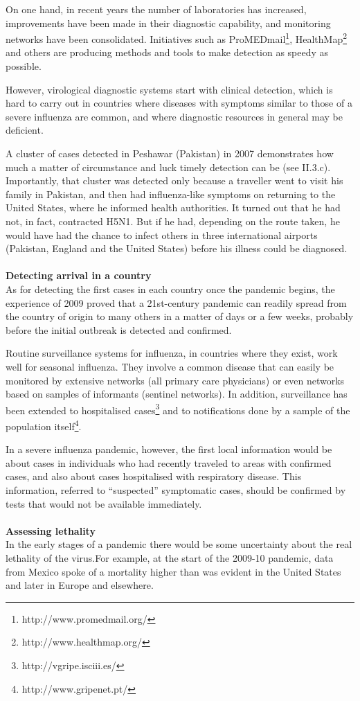 \documentclass[12pt, a4]{scrartcl}
\begin{document}
On one hand, in recent years the number of laboratories has increased, improvements have been made in their diagnostic capability, and monitoring networks have been consolidated. Initiatives such as ProMEDmail\footnote{http://www.promedmail.org/}, HealthMap\footnote{http://www.healthmap.org/} and others are producing methods and tools to make detection as speedy as possible.

However, virological diagnostic systems start with clinical detection, which is hard to carry out in countries where diseases with symptoms similar to those of a severe influenza are common, and where diagnostic resources in general may be deficient.

A cluster of cases detected in Peshawar (Pakistan) in 2007 demonstrates how much a matter of circumstance and luck timely detection can be (see II.3.c). Importantly, that cluster was detected only because a traveller went to visit his family in Pakistan, and then had influenza-like symptoms on returning to the United States, where he informed health authorities. It turned out that he had not, in fact, contracted H5N1. But if he had, depending on the route taken, he would have had the chance to infect others in three international airports (Pakistan, England and the United States) before his illness could be diagnosed.
\\
\\
\textbf{Detecting arrival in a country}\\
As for detecting the first cases in each country once the pandemic begins, the experience of 2009 proved that a 21st-century pandemic can readily spread from the country of origin to many others in a matter of days or a few weeks, probably before the initial outbreak is detected and confirmed.

Routine surveillance systems for influenza, in countries where they exist, work well for seasonal influenza. They involve a common disease that can easily be monitored by extensive networks (all primary care physicians) or even networks based on samples of informants (sentinel networks). In addition, surveillance has been extended to hospitalised cases\footnote{http://vgripe.isciii.es/} and to notifications done by a sample of the population itself\footnote{http://www.gripenet.pt/}.

In a severe influenza pandemic, however, the first local information would be about cases in individuals who had recently traveled to areas with confirmed cases, and also about cases hospitalised with respiratory disease. This information, referred to “suspected” symptomatic cases, should be confirmed by tests that would not be available immediately.
\\
\\
\textbf{Assessing lethality}\\
In the early stages of a pandemic there would be some uncertainty about the real lethality of the virus.For example, at the start of the 2009-10 pandemic, data from Mexico spoke of a mortality higher than was evident in the United States and later in Europe and elsewhere.
\end{document}
